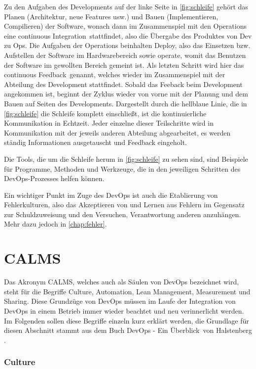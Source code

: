 Zu den Aufgaben des Developments auf der linke Seite in \autoref{fig:schleife} gehört das Planen (Architektur, neue Features usw.) und Bauen (Implementieren, Compilieren) der Software, wonach dann im Zusammenspiel mit den Operations eine \glqq continuous Integration\grqq\ stattfindet, also die Übergabe des Produktes von Dev zu Ops. Die Aufgaben der Operations beinhalten \glqq Deploy\grqq , also das Einsetzen bzw. Aufstellen der Software im Hardwarebereich sowie \glqq operate\grqq , womit das Benutzen der Software im gewollten Bereich gemeint ist. Als letzten Schritt wird hier das \glqq continuous Feedback\grqq\ genannt, welches wieder im Zusammenspiel mit der Abteilung des Development stattfindet. Sobald das Feeback beim Development angekommen ist, beginnt der Zyklus wieder von vorne mit der Planung und dem Bauen auf Seiten des Developments. Dargestellt durch die hellblaue Linie, die in \autoref{fig:schleife} die Schleife komplett einschließt, ist die kontinuierliche Kommunikation in Echtzeit. Jeder einzelne dieser Teilschritte wird in Kommunikation mit der jeweils anderen Abteilung abgearbeitet, es werden ständig Informationen ausgetauscht und Feedback eingeholt.

Die Tools, die um die Schleife herum in \autoref{fig:schleife} zu sehen sind, sind Beispiele für Programme, Methoden und Werkzeuge, die in den jeweiligen Schritten des \ac{DevOps}-Prozesses helfen können.

Ein wichtiger Punkt im Zuge des \ac{DevOps} ist auch die Etablierung von Fehlerkulturen, also das Akzeptieren von und Lernen aus Fehlern im Gegensatz zur Schuldzuweisung und den Versuchen, Verantwortung anderen anzuhängen. Mehr dazu jedoch in \autoref{chap:fehler}.

\section{CALMS}\label{sec:calms}

Das Akronym \glqq CALMS\grqq , welches auch als Säulen von \ac{DevOps} bezeichnet wird, steht für die Begriffe Culture, Automation, Lean Management, Measurement und Sharing. Diese Grundzüge von \ac{DevOps} müssen im Laufe der Integration von \ac{DevOps} in einem Betrieb immer wieder beachtet und neu verinnerlicht werden. Im Folgenden sollen diese Begriffe einzeln kurz erklärt werden, die Grundlage für diesen Abschnitt stammt aus dem Buch \glqq DevOps - Ein Überblick\grqq\ von Halstenberg \cite{halstenberg:2020}.

\subsubsection*{Culture}

